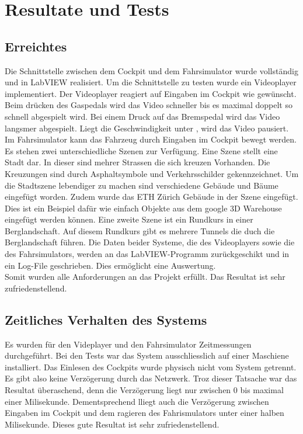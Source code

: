 \section{Resultate und Tests}
\subsection{Erreichtes}
Die Schnittstelle zwischen dem Cockpit und dem Fahrsimulator wurde vollständig und in LabVIEW realisiert. Um die Schnittstelle zu testen wurde ein Videoplayer implementiert. Der Videoplayer reagiert auf Eingaben im Cockpit wie gewünscht. Beim drücken des Gaspedals wird das Video schneller bis es maximal doppelt so schnell abgespielt wird. Bei einem Druck auf das Bremspedal wird das Video langsmer abgespielt. Liegt die Geschwindigkeit unter , wird das Video pausiert. Im Fahrsimulator kann das Fahrzeug durch Eingaben im Cockpit bewegt werden. Es stehen zwei unterschiedliche Szenen zur Verfügung. Eine Szene stellt eine Stadt dar. In dieser sind mehrer Strassen die sich kreuzen Vorhanden. Die Kreuzungen sind durch Asphaltsymbole und Verkehrsschilder gekennzeichnet. Um die Stadtszene lebendiger zu machen sind verschiedene Gebäude und Bäume eingefügt worden. Zudem wurde das ETH Zürich Gebäude in der Szene eingefügt. Dies ist ein Beispiel dafür wie einfach Objekte aus dem google 3D Warehouse eingefügt werden können. Eine zweite Szene ist ein Rundkurs in einer Berglandschaft. Auf diesem Rundkurs gibt es mehrere Tunnels die duch die Berglandschaft führen. 
Die Daten beider Systeme, die des Videoplayers sowie die des Fahrsimulators, werden an das LabVIEW-Programm zurückgeschikt und in ein Log-File geschrieben. Dies ermöglicht eine Auswertung.\\
Somit wurden alle Anforderungen an das Projekt erfüllt. Das Resultat ist sehr zufriedenstellend. 
\subsection{Zeitliches Verhalten des Systems}
Es wurden für den Videplayer und den Fahrsimulator Zeitmessungen durchgeführt. Bei den Tests war das System ausschliesslich auf einer Maschiene installiert. Das Einlesen des Cockpits wurde physisch nicht vom System getrennt. Es gibt also keine Verzögerung durch das Netzwerk. Troz dieser Tatsache war das Resultat überaschend, denn die Verzögerung liegt nur zwischen 0 bis maximal einer Milisekunde. Dementsprechend lliegt auch die Verzögerung zwischen Eingaben im Cockpit und dem ragieren des Fahrismulators unter einer halben Milisekunde. Dieses gute Resultat ist sehr zufriedenstellend. 
